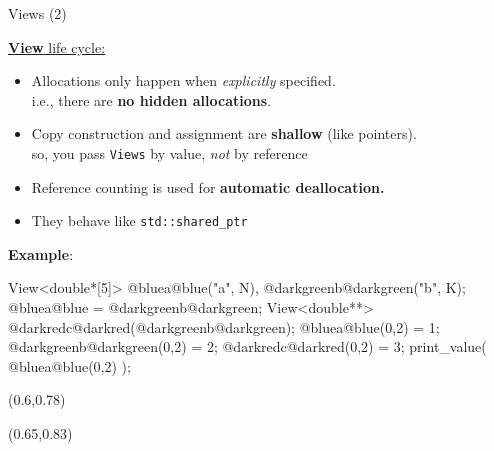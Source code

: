 \begin{frame}[fragile]{Views (2)}

  \ul{\textbf{View} life cycle:}

  \begin{itemize}
    \item{Allocations only happen when \emph{explicitly} specified. \\
          \hspace{20pt}i.e., there are \textbf{no hidden allocations}.}
    \item{Copy construction and assignment are \textbf{shallow} (like pointers).\\
          \hspace{20pt}so, you pass \texttt{Views} by value, \emph{not} by reference}
    \item{Reference counting is used for \textbf{automatic deallocation.}}
    \item{They behave like \texttt{std::shared\_ptr}}
  \end{itemize}

  \pause
  \textbf{Example}:

  \vspace{-3pt}

  \begin{code}[keywords={}]
View<double*[5]> @bluea@blue("a", N), @darkgreenb@darkgreen("b", K);
@bluea@blue = @darkgreenb@darkgreen;
View<double**> @darkredc@darkred(@darkgreenb@darkgreen);
@bluea@blue(0,2) = 1;
@darkgreenb@darkgreen(0,2) = 2;
@darkredc@darkred(0,2) = 3;
print_value( @bluea@blue(0,2) );
  \end{code}

  \begin{textblock*}{0.5\textwidth}(0.6\textwidth,0.78\textheight)
  \end{textblock*}

  \begin{textblock*}{0.5\textwidth}(0.65\textwidth,0.83\textheight)
  \end{textblock*}

\end{frame}


